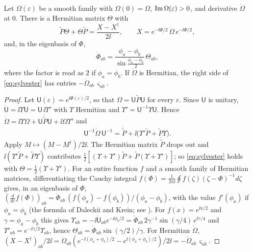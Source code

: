 \begin{lemma}\label{lem:variation}
Let $\Omega(\varepsilon)$ be a smooth family with $\Omega(0)=\Omega$,
$\operatorname{Im}\Omega(\varepsilon)>0$, and derivative $\dot\Omega$ at $0$. There is a
Hermitian matrix $\Theta$ with
\begin{equation}\label{eq:sylvester}
 \tilde P\Theta+\Theta\tilde P=\frac{X-X^\dagger}{2\ii},\qquad
 X=e^{-\ii\Phi/2}\,\dot\Omega\,e^{-\ii\Phi/2},
\end{equation}
and, in the eigenbasis of $\Phi$,
\begin{equation}\label{eq:phidot}
 \dot\Phi_{ab}=\frac{\phi_a-\phi_b}{\sin\frac{\phi_a-\phi_b}2}\,\Theta_{ab},
\end{equation}
where the factor is read as $2$ if $\phi_a=\phi_b$. If $\dot\Omega$ is
Hermitian, the right side of \eqref{eq:sylvester} has entries
$-\dot\Omega_{ab}\,\varsigma_{ab}$.
\end{lemma}

\begin{proof}
Let $\mathsf U(\varepsilon)=e^{\ii\Phi(\varepsilon)/2}$, so that
$\Omega=\mathsf U\tilde P\mathsf U$ for every $\varepsilon$. Since
$\mathsf U$ is unitary,
$\dot{\mathsf U}=\ii\Upsilon\mathsf U=\mathsf U\,\ii\Upsilon'$ with $\Upsilon$ Hermitian and
$\Upsilon'=\mathsf U^{-1}\Upsilon\mathsf U$. Hence
$\dot\Omega=\ii\Upsilon\Omega+\mathsf U\dot{\tilde P}\mathsf U+\ii\Omega\Upsilon'$ and
\[
 \mathsf U^{-1}\dot\Omega\,\mathsf U^{-1}
 =\dot{\tilde P}+\ii\bigl(\Upsilon'\tilde P+\tilde P\Upsilon\bigr).
\]
Apply $M\mapsto(M-M^\dagger)/2\ii$. The Hermitian matrix $\dot{\tilde P}$
drops out and $\ii(\Upsilon'\tilde P+\tilde P\Upsilon)$ contributes
$\frac12[(\Upsilon+\Upsilon')\tilde P+\tilde P(\Upsilon+\Upsilon')]$; so \eqref{eq:sylvester}
holds with $\Theta=\frac12(\Upsilon+\Upsilon')$. For an entire function $f$ and
a smooth family of Hermitian matrices, differentiating the Cauchy integral
$f(\Phi)=\frac1{2\pi\ii}\oint f(\zeta)(\zeta-\Phi)^{-1}d\zeta$ gives, in an
eigenbasis of $\Phi$,
$(\frac d{d\varepsilon}f(\Phi))_{ab}=\dot\Phi_{ab}\,(f(\phi_a)-f(\phi_b))/(\phi_a-\phi_b)$,
with the value $f'(\phi_a)$ if $\phi_a=\phi_b$ (the formula of Daleckii and
Krein; see \cite{bha97}). For $f(x)=e^{\ii x/2}$ and
$\gamma=\phi_a-\phi_b$ this gives
$\Upsilon_{ab}=-\ii\dot{\mathsf U}_{ab}e^{-\ii\phi_b/2}
=\dot\Phi_{ab}\,2\gamma^{-1}\sin(\gamma/4)\,e^{\ii\gamma/4}$ and
$\Upsilon'_{ab}=e^{-\ii\gamma/2}\Upsilon_{ab}$, hence
$\Theta_{ab}=\dot\Phi_{ab}\sin(\gamma/2)/\gamma$. For Hermitian
$\dot\Omega$,
$(X-X^\dagger)_{ab}/2\ii=\dot\Omega_{ab}(e^{-\ii(\phi_a+\phi_b)/2}-e^{\ii(\phi_a+\phi_b)/2})/2\ii
=-\dot\Omega_{ab}\,\varsigma_{ab}$.
\end{proof}

